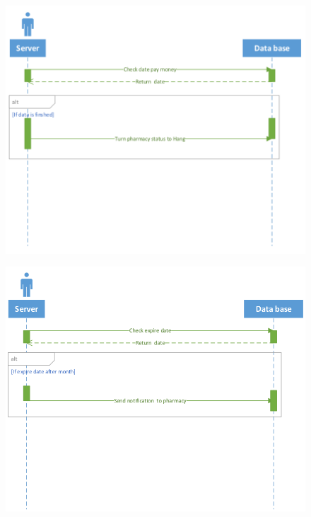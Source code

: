 \documentclass[]{article}
\begin{document}
\begin{figure}[H]
\centering
\includegraphics[scale=0.3]{./sequence/25}
\end{figure}
\begin{figure}[H]
\centering
\includegraphics[scale=0.3]{./sequence/26}
\end{figure}
\end{document}
